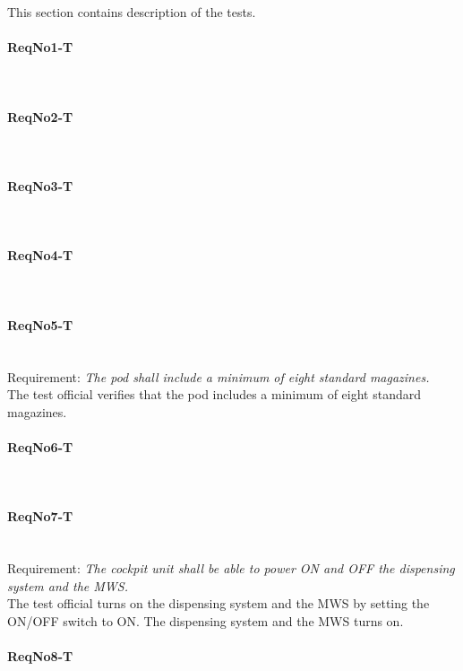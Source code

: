 This section contains description of the tests.

\paragraph{ReqNo1-T}\mbox{}\\ %

\paragraph{ReqNo2-T}\mbox{}\\ %


\paragraph{ReqNo3-T}\mbox{}\\ %


\paragraph{ReqNo4-T}\mbox{}\\ %

\paragraph{ReqNo5-T}\mbox{}\\ %
Requirement: \textit{The pod shall include a minimum of eight standard magazines.}\\
The test official verifies that the pod includes a minimum of eight standard magazines.

\paragraph{ReqNo6-T}\mbox{}\\ %

\paragraph{ReqNo7-T}\mbox{}\\ %
Requirement: \textit{The cockpit unit shall be able to power ON and OFF the dispensing system and the MWS.}\\
The test official turns on the dispensing system and the MWS by setting the ON/OFF switch to ON. The dispensing system and the MWS turns on.\\


\paragraph{ReqNo8-T}\mbox{}\\ %


